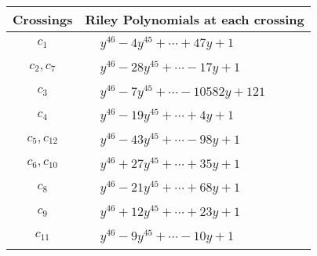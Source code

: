 \documentclass[1p]{elsarticle_modified}
\theoremstyle{definition}
\begin{document}
\begin{tabular}{m{50pt}|m{274pt}}
Crossings & \hspace{64pt}Riley Polynomials at each crossing \\
\hline $$\begin{aligned}c_{1}\end{aligned}$$&$\begin{aligned}
&y^{46}-4 y^{45}+\cdots+47 y+1
\end{aligned}$\\
\hline $$\begin{aligned}c_{2},c_{7}\end{aligned}$$&$\begin{aligned}
&y^{46}-28 y^{45}+\cdots-17 y+1
\end{aligned}$\\
\hline $$\begin{aligned}c_{3}\end{aligned}$$&$\begin{aligned}
&y^{46}-7 y^{45}+\cdots-10582 y+121
\end{aligned}$\\
\hline $$\begin{aligned}c_{4}\end{aligned}$$&$\begin{aligned}
&y^{46}-19 y^{45}+\cdots+4 y+1
\end{aligned}$\\
\hline $$\begin{aligned}c_{5},c_{12}\end{aligned}$$&$\begin{aligned}
&y^{46}-43 y^{45}+\cdots-98 y+1
\end{aligned}$\\
\hline $$\begin{aligned}c_{6},c_{10}\end{aligned}$$&$\begin{aligned}
&y^{46}+27 y^{45}+\cdots+35 y+1
\end{aligned}$\\
\hline $$\begin{aligned}c_{8}\end{aligned}$$&$\begin{aligned}
&y^{46}-21 y^{45}+\cdots+68 y+1
\end{aligned}$\\
\hline $$\begin{aligned}c_{9}\end{aligned}$$&$\begin{aligned}
&y^{46}+12 y^{45}+\cdots+23 y+1
\end{aligned}$\\
\hline $$\begin{aligned}c_{11}\end{aligned}$$&$\begin{aligned}
&y^{46}-9 y^{45}+\cdots-10 y+1
\end{aligned}$\\
\hline
\end{tabular}\\~\\
\end{document}
